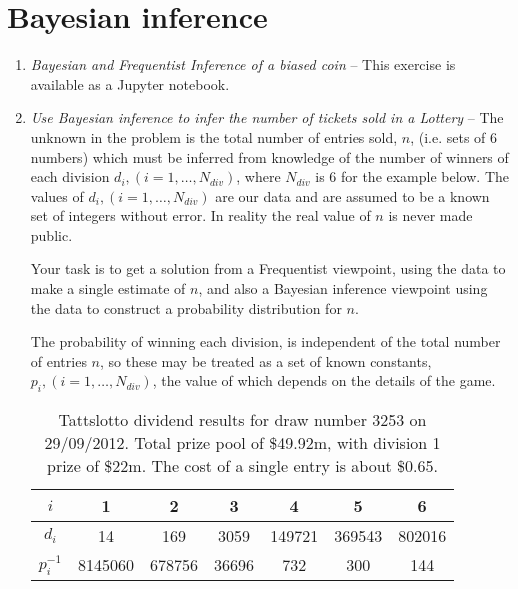 \documentclass[a4paper,11pt]{article}
\begin{document}
 
\section{Bayesian inference}

\begin{enumerate}[resume]

\item \textit{Bayesian and Frequentist Inference of a biased coin} \label{q:Bayescoin} -- This exercise is available as a Jupyter notebook.
\item \textit{Use Bayesian inference to infer the number of tickets sold in a Lottery} \label{q:Bayeslot} -- The unknown in the problem is the total number of entries sold, $n$, (i.e. sets of 6 numbers) which must be inferred from knowledge of the number of winners of each division $d_i, (i=1,\dots,N_{div}) $, where $N_{div}$ is  6 for the example below. The values of $d_i, (i=1,\dots,N_{div}) $ are our data and are assumed to be a known set of integers without error. In reality the real value of $n$ is never made public.
 
Your task is to get a solution from a Frequentist viewpoint, using the data to make a single estimate of $n$, and also a Bayesian inference viewpoint using the data to construct  a probability distribution for $n$.
 
 The probability of winning each division,  is independent of the total number of entries $n$, so these may be treated as a set of  known constants, $p_i, (i=1,\dots, N_{div})$, the value of which depends on the details of the game.
 \vskip 0.5cm
\begin{table}[h!]
\renewcommand{\arraystretch}{1.3}
\begin{center}
\begin{tabular}{|c|c|c|c|c|c|c|}
\hline 
$i$ & 1 & 2 & 3 & 4 & 5 & 6 \\

\hline
$d_i$ & 14 & 169 & 3059 & 149721 & 369543 & 802016 \\
\hline
$p_i^{-1}$ & 8145060 & 678756 & 36696 & 732 & 300 & 144 \\
\hline
\end{tabular}
\caption{\small Tattslotto dividend results for draw number 3253 on 29/09/2012. Total prize pool of \$49.92m, with division 1 prize of \$22m. The cost of a single entry is about \$0.65.}
\end{center} 
\label{tab:lotto}
\end{table}
  \begin{enumerate}
  

\end{enumerate}
\end{enumerate}
\end{document}
